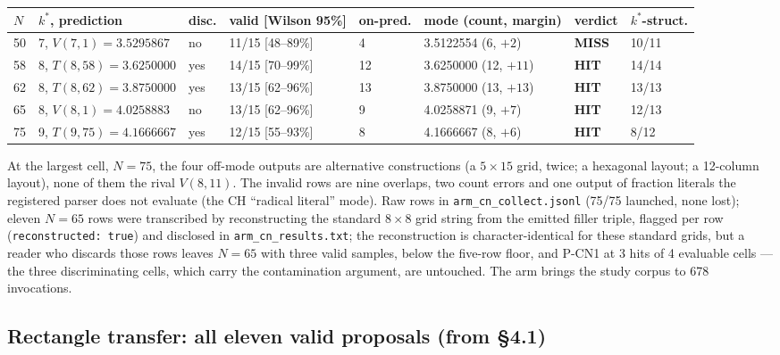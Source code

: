 \begin{center}
\begin{footnotesize}
\setlength{\tabcolsep}{4pt}
\begin{tabular}{llllllll}
\toprule
$N$ & $k^*$, prediction & disc. & valid [Wilson 95\%] & on-pred. & mode (count, margin) & verdict & $k^*$-struct. \\
\midrule
50 & 7, $V(7,1) = 3.5295867$ & no & 11/15 [48--89\%] & 4 & 3.5122554 (6, $+2$) & \textbf{MISS} & 10/11 \\
58 & 8, $T(8,58) = 3.6250000$ & yes & 14/15 [70--99\%] & 12 & 3.6250000 (12, $+11$) & \textbf{HIT} & 14/14 \\
62 & 8, $T(8,62) = 3.8750000$ & yes & 13/15 [62--96\%] & 13 & 3.8750000 (13, $+13$) & \textbf{HIT} & 13/13 \\
65 & 8, $V(8,1) = 4.0258883$ & no & 13/15 [62--96\%] & 9 & 4.0258871 (9, $+7$) & \textbf{HIT} & 12/13 \\
75 & 9, $T(9,75) = 4.1666667$ & yes & 12/15 [55--93\%] & 8 & 4.1666667 (8, $+6$) & \textbf{HIT} & 8/12 \\
\bottomrule
\end{tabular}
\end{footnotesize}
\end{center}

At the largest cell, $N = 75$, the four off-mode outputs are alternative constructions (a
$5 \times 15$ grid, twice; a hexagonal layout; a 12-column layout), none of them the rival
$V(8,11)$. The invalid rows are nine overlaps, two count errors and one output of fraction literals
the registered parser does not evaluate (the CH ``radical literal'' mode). Raw rows in
\texttt{arm\_cn\_collect.jsonl} (75/75 launched, none lost); eleven $N = 65$ rows were
transcribed by reconstructing the standard $8 \times 8$ grid string from the emitted filler
triple, flagged per row (\texttt{reconstructed: true}) and disclosed in \texttt{arm\_cn\_results.txt}; the reconstruction is character-identical for these standard grids, but a reader who discards those rows leaves $N = 65$ with three valid samples, below the five-row floor, and P-CN1 at 3 hits of 4 evaluable cells --- the three discriminating cells, which carry the contamination argument, are untouched. The arm brings the study corpus to 678
invocations.

\subsection{Rectangle transfer: all eleven valid proposals (from \S4.1)}

